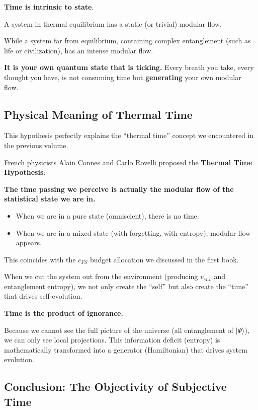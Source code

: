 \documentclass[11pt,a4paper,twoside]{book}
\begin{document}
\textbf{Time is intrinsic to state}.

A system in thermal equilibrium has a static (or trivial) modular flow.

While a system far from equilibrium, containing complex entanglement (such as life or civilization), has an intense modular flow.

\textbf{It is your own quantum state that is ticking.} Every breath you take, every thought you have, is not consuming time but \textbf{generating} your own modular flow.

\subsection{Physical Meaning of Thermal Time}

This hypothesis perfectly explains the ``thermal time'' concept we encountered in the previous volume.

French physicists Alain Connes and Carlo Rovelli proposed the \textbf{Thermal Time Hypothesis}:

\textbf{The time passing we perceive is actually the modular flow of the statistical state we are in.}

\begin{itemize}
\item When we are in a pure state (omniscient), there is no time.

\item When we are in a mixed state (with forgetting, with entropy), modular flow appears.
\end{itemize}

This coincides with the $c_{FS}$ budget allocation we discussed in the first book.

When we cut the system out from the environment (producing $v_{env}$ and entanglement entropy), we not only create the ``self'' but also create the ``time'' that drives self-evolution.

\textbf{Time is the product of ignorance.}

Because we cannot see the full picture of the universe (all entanglement of $|\Psi\rangle$), we can only see local projections. This information deficit (entropy) is mathematically transformed into a generator (Hamiltonian) that drives system evolution.

\subsection{Conclusion: The Objectivity of Subjective Time}
\end{document}
